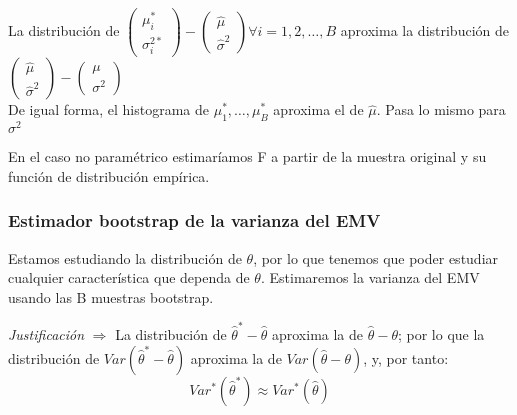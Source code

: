 \noindent La distribución de $\begin{pmatrix}\mu^*_i \\ \sigma^{2*}_i\end{pmatrix}-\begin{pmatrix}\hat\mu \\ \hat\sigma^{2}\end{pmatrix}\forall i=1,2,\dots,B$ aproxima la distribución de $\begin{pmatrix}\hat\mu \\ \hat\sigma^{2}\end{pmatrix}-\begin{pmatrix}\mu \\ \sigma^{2}\end{pmatrix}$\\
De igual forma, el histograma de $\mu^*_1,\dots,\mu^*_B$ aproxima el de $\hat\mu$. Pasa lo mismo para $\sigma^2$

En el caso no paramétrico estimaríamos F a partir de la muestra original y su función de distribución empírica.

\subsubsection{Estimador bootstrap de la varianza del EMV}

Estamos estudiando la distribución de $\theta$, por lo que tenemos que poder estudiar cualquier característica que dependa de $\theta$. Estimaremos la varianza del EMV usando las B muestras bootstrap.

\textit{Justificación} $\Longrightarrow$ La distribución de $\hat\theta^*-\hat\theta$ aproxima la de $\hat\theta-\theta$; por lo que la distribución de $Var(\hat\theta^*-\hat\theta)$ aproxima la de $Var(\hat\theta-\theta)$, y, por tanto:
$$Var^*(\hat\theta^*)\approx Var^*(\hat\theta)$$



